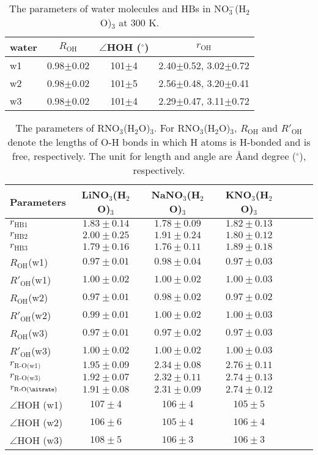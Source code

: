%
\begin{table}[!htbp]
\centering
\caption{\label{tab:3w_nitrate}%
The parameters of water molecules and HBs in NO$_3^-$(H$_2$O)$_3$ at 300 K.}
\begin{tabular}{lccc}
water &$R_\text{OH}$ &$\angle$HOH ($^\circ$) & $r_\text{OH}$ \\
\hline
w1 &0.98$\pm$0.02 &101$\pm$4 & 2.40$\pm$0.52, 3.02$\pm$0.72 \\
w2 &0.98$\pm$0.02 &101$\pm$5 & 2.56$\pm$0.48, 3.20$\pm$0.41 \\
w3 &0.98$\pm$0.02 &101$\pm$4 & 2.29$\pm$0.47, 3.11$\pm$0.72
\end{tabular}
\end{table}
%
\begin{table}[!htbp]
\centering
\caption{\label{tab:table_rnitrate_3w}%
The parameters of RNO$_3$(H$_2$O)$_3$. For RNO$_3$(H$_2$O)$_3$, $R_\text{OH}$ and $R'_\text{OH}$ 
  denote the lengths of O-H bonds in which H atoms is H-bonded and is free, respectively.
  The unit for length and angle are \AA and degree ($^\circ$), respectively.
  }
\begin{tabular}{l*{4}ccc}
Parameters & LiNO$_3$(H$_2$O)$_3$& NaNO$_3$(H$_2$O)$_3$ & KNO$_3$(H$_2$O)$_3$\\
\hline
$r_\text{HB1}$ & $1.83\pm0.14$ & $1.78\pm0.09$ & $1.82\pm0.13$\\
$r_\text{HB2}$ & $2.00\pm0.25$ & $1.91\pm0.24$ & $1.80\pm0.12$\\
$r_\text{HB3}$ &$1.79\pm0.16$ & $1.76\pm0.11$ & $1.89\pm0.18$\\
$R_\text{OH}$(w1) &$0.97\pm0.01$ &$0.98\pm0.04$ &$0.97\pm0.03$ \\
$R'_\text{OH}$(w1) &$1.00\pm0.02$ &$1.00\pm0.02$ & $1.00\pm0.03$ \\
$R_\text{OH} $(w2) &$0.97\pm0.01$ &$0.98\pm0.02$ &$0.97\pm0.02$ \\ 
$R'_\text{OH}$(w2) &$0.99\pm0.01$ &$1.00\pm0.02$ & $1.00\pm0.03$ \\
$R_\text{OH}$(w3) &$0.97\pm0.01$ & $0.97\pm0.02$&$0.97\pm0.03$ \\
$R'_\text{OH}$(w3) &$1.00\pm0.02$ &$1.00\pm0.02$ & $1.00\pm0.03$ \\
$r_\text{R-O(w1)}$ & $1.95\pm0.09$ & $2.34\pm0.08$ & $2.76\pm0.11$\\
$r_\text{R-O(w3)}$ & $1.92\pm0.07$ & $2.32\pm0.11$ & $2.74\pm0.13$\\
$r_\text{R-O(\nitrate)}$ & $1.91\pm0.08$ & $2.31\pm0.09$ & $2.74\pm0.12$ \\
$\angle$HOH (w1) &$107\pm4$ & $106\pm4$ &$105\pm5$ \\
$\angle$HOH (w2) &$106\pm6$ & $105\pm4$ &$106\pm4$ \\
$\angle$HOH (w3) &$108\pm5$ & $106\pm3$ &$106\pm3$ 
\end{tabular}
\end{table}

